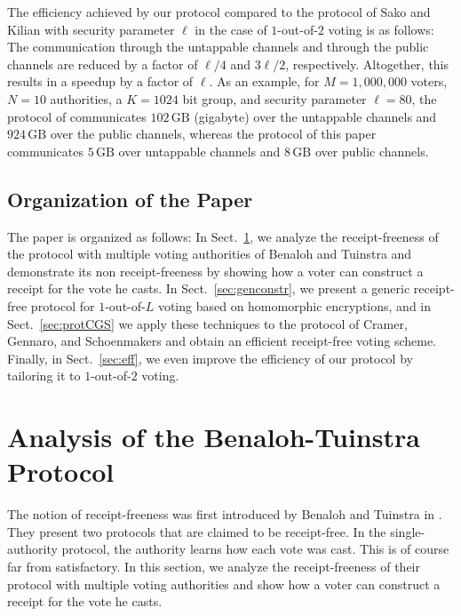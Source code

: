 \documentclass{article}
\begin{document}
The efficiency achieved by our protocol compared to the protocol
of Sako and Kilian \cite{SK95} with security parameter $\ell$ in the
case of $1$-out-of-$2$ voting is as follows:
The communication through the untappable channels and through the
public channels are reduced by a factor of $\ell/4$ and $3\ell/2$,
respectively. Altogether, this results in a speedup by a factor of $\ell$.
As an example, for $M=1,000,000$ voters, $N=10$ authorities, a $K=1024$ bit
group, and security parameter $\ell=80$, the protocol of \cite{SK95}
communicates $102\,\mathrm{GB}$ (gigabyte) over the untappable channels and
$924\,\mathrm{GB}$ over the public channels, whereas the protocol of this
paper communicates $5\,\mathrm{GB}$ over untappable channels and
$8\,\mathrm{GB}$ over public channels.

\subsection{Organization of the Paper}

The paper is organized as follows: In Sect.~\ref{sec:BT}, we analyze the
receipt-freeness of the protocol with multiple voting authorities of
Benaloh and Tuinstra \cite{BT94} and demonstrate its non receipt-freeness
by showing how a voter can construct a receipt for the vote he casts. In
Sect.~\ref{sec:genconstr}, we present a generic receipt-free protocol
for $1$-out-of-$L$ voting based on homomorphic encryptions, and in
Sect.~\ref{sec:protCGS} we apply these techniques to the protocol of
Cramer, Gennaro, and Schoenmakers \cite{CGS97} and obtain an efficient
receipt-free voting scheme. Finally, in Sect.~\ref{sec:eff}, we even
improve the efficiency of our protocol by tailoring it to $1$-out-of-$2$
voting.



\section{Analysis of the Benaloh-Tuinstra Protocol}\label{sec:BT}

The notion of receipt-freeness was first introduced by Benaloh and Tuinstra
in \cite{BT94}.  They present two protocols that are claimed to be
receipt-free. In the single-authority protocol, the authority learns how
each vote was cast. This is of course far from satisfactory.  In this
section, we analyze the receipt-freeness of their protocol with multiple
voting authorities and show how a voter can construct a receipt for the
vote he casts.
\end{document}
